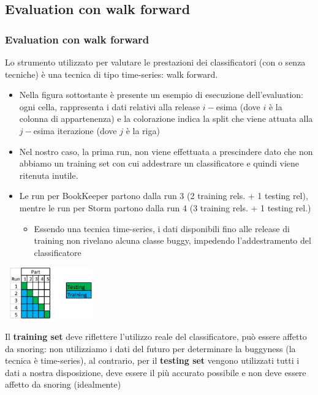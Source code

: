 \documentclass{beamer}
\begin{document}
\subsection{Evaluation con walk forward}
\begin{frame}
	\frametitle{Evaluation con walk forward}
	
	\fontsize{8pt}{10pt}\selectfont
	
	Lo strumento utilizzato per valutare le prestazioni dei classificatori (con o senza tecniche) è
	una tecnica di tipo time-series: walk forward.
	
	\begin{itemize}
		\item Nella figura sottostante è presente un esempio di esecuzione dell'evaluation: ogni cella,
		rappresenta i dati relativi alla release $i-$esima (dove $i$ è la colonna di appartenenza) 
		e la colorazione indica la split che viene attuata alla $j-$esima iterazione (dove $j$ è la riga)
	
		\item Nel nostro caso, la prima run, non viene effettuata a prescindere dato che non abbiamo un training set con cui addestrare
		un classificatore e quindi viene ritenuta inutile.
		\item Le run per BookKeeper partono dalla run 3 
		(2 training rels. + 1 testing rel), 
		mentre le run per Storm partono dalla run 4 (3 training rels.  + 1 testing rel.)
		\begin{itemize}
			\fontsize{7pt}{10pt}\selectfont
			\item Essendo una tecnica time-series, i dati disponibili fino alle release di training non rivelano
			alcuna classe buggy, impedendo l'addestramento del classificatore
		\end{itemize}
	\end{itemize}
	
	\begin{center}
	\includegraphics[width=4cm, height=2.25cm]{walkforward}
	\end{center}
	
	\fontsize{8pt}{10pt}\selectfont
	
	Il \textbf{training set} deve riflettere l'utilizzo reale del classificatore, 
	può essere affetto da snoring: non utilizziamo i dati del futuro per determinare 
	la buggyness (la tecnica è time-series), al contrario, per il \textbf{testing set}
	vengono utilizzati tutti i dati a nostra disposizione, deve essere
	il più accurato possibile e non deve essere affetto da snoring (idealmente)
\end{frame}
\end{document}
